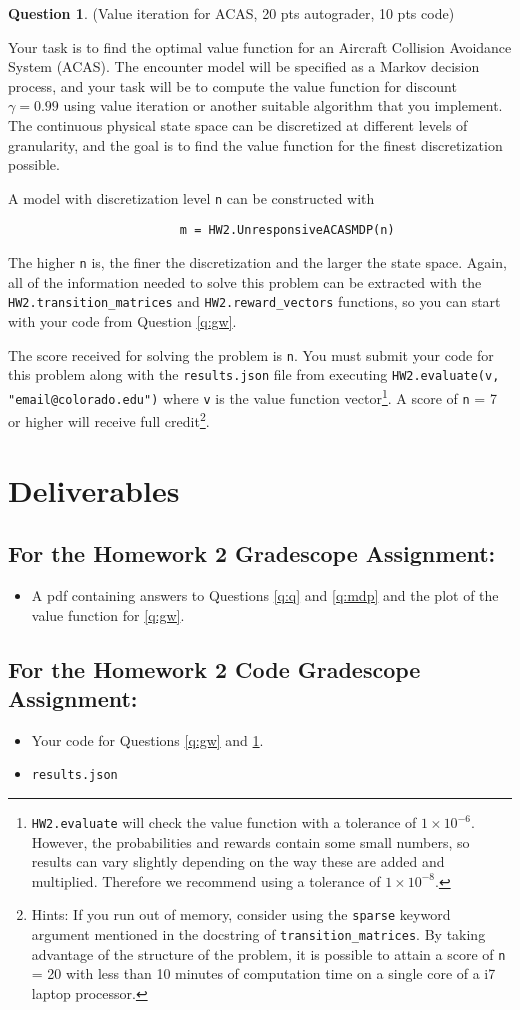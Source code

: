 \documentclass{article}
\theoremstyle{definition}
\newtheorem{question}[thm]{Question}
\begin{document}
\begin{question}\label{q:acas}
    (Value iteration for ACAS, 20 pts autograder, 10 pts code)

Your task is to find the optimal value function for an Aircraft Collision Avoidance System (ACAS). The encounter model will be specified as a Markov decision process, and your task will be to compute the value function for discount $\gamma=0.99$ using value iteration or another suitable algorithm that you implement. The continuous physical state space can be discretized at different levels of granularity, and the goal is to find the value function for the finest discretization possible.

A model with discretization level \texttt{n} can be constructed with
\begin{verbatim}
                        m = HW2.UnresponsiveACASMDP(n)
\end{verbatim}
The higher \texttt{n} is, the finer the discretization and the larger the state space. Again, all of the information needed to solve this problem can be extracted with the \texttt{HW2.transition\_matrices} and \texttt{HW2.reward\_vectors} functions, so you can start with your code from Question \ref{q:gw}.

The score received for solving the problem is \texttt{n}. You must submit your code for this problem along with the \texttt{results.json} file from executing \texttt{HW2.evaluate(v, "email@colorado.edu")} where \texttt{v} is the value function vector\footnote{\texttt{HW2.evaluate} will check the value function with a tolerance of $1 \times 10^{-6}$. However, the probabilities and rewards contain some small numbers, so results can vary slightly depending on the way these are added and multiplied. Therefore we recommend using a tolerance of $1 \times 10^{-8}$.}. A score of \texttt{n} = 7 or higher will receive full credit\footnote{Hints: If you run out of memory, consider using the \texttt{sparse} keyword argument mentioned in the docstring of \texttt{transition\_matrices}. By taking advantage of the structure of the problem, it is possible to attain a score of \texttt{n} = 20 with less than 10 minutes of computation time on a single core of a i7 laptop processor.}.

\end{question}

\section*{Deliverables}
\subsection*{For the Homework 2 Gradescope Assignment:}
\begin{itemize}
    \item A pdf containing answers to Questions \ref{q:q} and \ref{q:mdp} and the plot of the value function for \ref{q:gw}.
\end{itemize}

\subsection*{For the Homework 2 Code Gradescope Assignment:}
\begin{itemize}
    \item Your code for Questions \ref{q:gw} and \ref{q:acas}.
    \item \texttt{results.json}
\end{itemize}
\end{document}
